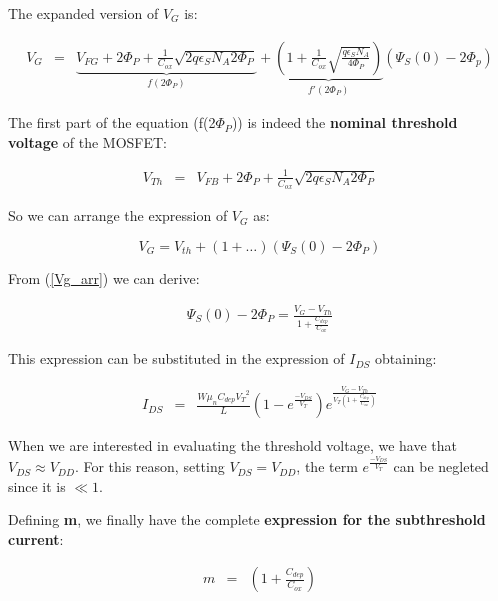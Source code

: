 \documentclass[a4paper, 12pt, twoside, openright]{report}
\begin{document}
The expanded version of $V_{G}$ is:

	\begin{eqnarray*}
	   V_G &=&  \underbrace{V_{FG}+2\Phi_P+\frac{1}{C_{ox}}\sqrt{2q\epsilon_S N_A 2\Phi_P}}_{f(2\Phi_P)} +  \underbrace{\left( 1+ \frac{1}{C_{ox}}\sqrt{\frac{q\epsilon_SN_A}{4\Phi_P}}\right)}_{f'(2\Phi_P)} \left(\Psi_S(0)-2\Phi_p\right)
	\end{eqnarray*}

The first part of the equation (f(2$\Phi_P$)) is indeed the \textbf{nominal threshold voltage} of the MOSFET:

	\begin{eqnarray*}
	   V_{Th} &=& V_{FB}+2\Phi_P+\frac{1}{C_{ox}}\sqrt{2q\epsilon_S N_A 2\Phi_P}
	\end{eqnarray*}

So we can arrange the expression of $V_{G}$ as:

\begin{equation}
V_G = V_{th} + (1+ \dots) (\Psi_S(0) - 2\Phi_P)
\label{Vg_arr}
\end{equation}



From (\ref{Vg_arr}) we can derive:

          \begin{eqnarray*}
             \Psi_S(0)-2\Phi_P=\frac{V_G-V_{Th}}{1 +\frac{C_{dep}}{C_{ox}}}
          \end{eqnarray*}

This expression can be substituted in the expression of $I_{DS}$ obtaining:

    \begin{eqnarray*}
    I_{DS}    &=& \frac{W \mu_n C_{dep} {V_T}^2}{L}
                  \left( 1-e^{\displaystyle\frac{-V_{DS}}{V_T}}\right) 
            e^{\displaystyle \frac{ {V_G-V_{Th}}}{V_T\left(1 +\frac{C_{dep}}{C_{ox}}\right)}} 
     \end{eqnarray*}

When we are interested in evaluating the threshold voltage, we have that $V_{DS} \approx V_{DD}$. For this reason, setting $V_{DS} = V_{DD}$, the term $e^{\frac{-V_{DS}}{V_T}}$ can be negleted since it is $\ll 1$.

Defining \textbf{m}, we finally have the complete \textbf{expression for the subthreshold current}:

    \begin{eqnarray*}
       {m}&=& \left(1 +\frac{C_{dep}}{C_{ox}}\right)
     \end{eqnarray*}
\end{document}
